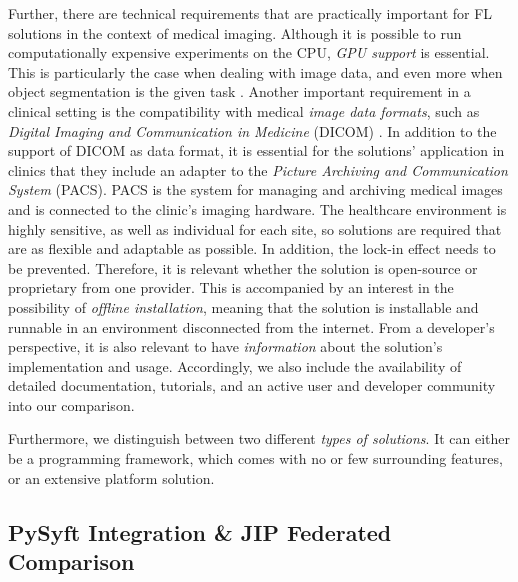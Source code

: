 Further, there are technical requirements that are practically important for FL solutions in the context of medical imaging.
Although it is possible to run computationally expensive experiments on the CPU, \textit{GPU support} is essential. This is particularly the case when dealing with image data, and even more when object segmentation is the given task \cite{Kaissis2021End-to-endImaging, Lee2021FederatedEnvironment}.
Another important requirement in a clinical setting is the  compatibility with medical \textit{image data formats}, such as \textit{Digital Imaging and Communication in Medicine} (DICOM) \citep{Kaissis2021End-to-endImaging}.
In addition to the support of DICOM as data format, it is essential for the solutions' application in clinics that they  include an adapter to the \textit{Picture Archiving and Communication System} (PACS). PACS is the system for managing and archiving medical images and is connected to the clinic's imaging hardware.
The healthcare environment is highly sensitive, as well as individual for each site, so solutions are required that are as flexible and adaptable as possible. In addition, the lock-in effect needs to be prevented. Therefore, it is relevant whether the solution is open-source or proprietary from one provider.
This is accompanied by an interest in the possibility of \textit{offline installation}, meaning that the solution is installable and runnable in an environment disconnected from the internet.
From a developer's perspective, it is also relevant to have \textit{information} about the solution's implementation and usage. Accordingly, we also include the availability of detailed documentation, tutorials, and an active user and developer community into our comparison.

Furthermore, we distinguish between two different \textit{types of solutions}. It can either be a programming framework, which comes with no or few surrounding features, or an extensive platform solution.






\subsection{PySyft Integration \& JIP Federated Comparison}
\label{subsec:ResultsRuntime}

